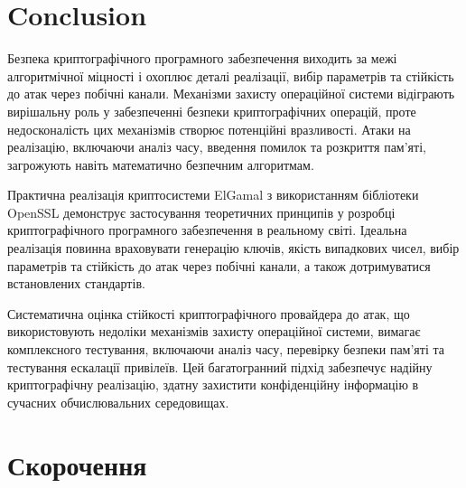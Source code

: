 \section{Conclusion}

Безпека криптографічного програмного забезпечення виходить за межі алгоритмічної міцності і охоплює деталі
реалізації, вибір параметрів та стійкість до атак через побічні канали. Механізми захисту операційної системи
відіграють вирішальну роль у забезпеченні безпеки криптографічних операцій, проте недосконалість цих
механізмів створює потенційні вразливості. Атаки на реалізацію, включаючи аналіз часу, введення помилок та
розкриття пам'яті, загрожують навіть математично безпечним алгоритмам.

Практична реалізація криптосистеми ElGamal з використанням бібліотеки OpenSSL демонструє застосування
теоретичних принципів у розробці криптографічного програмного забезпечення в реальному світі. Ідеальна реалізація
повинна враховувати генерацію ключів, якість випадкових чисел, вибір параметрів та стійкість до атак через
побічні канали, а також дотримуватися встановлених стандартів.

Систематична оцінка стійкості криптографічного провайдера до атак, що використовують недоліки
механізмів захисту операційної системи, вимагає комплексного тестування, включаючи аналіз часу, перевірку
безпеки пам'яті та тестування ескалації привілеїв. Цей багатогранний підхід забезпечує надійну криптографічну
реалізацію, здатну захистити конфіденційну інформацію в сучасних обчислювальних середовищах.

\newpage

\printbibliography

\appendix

\section{Скорочення}

